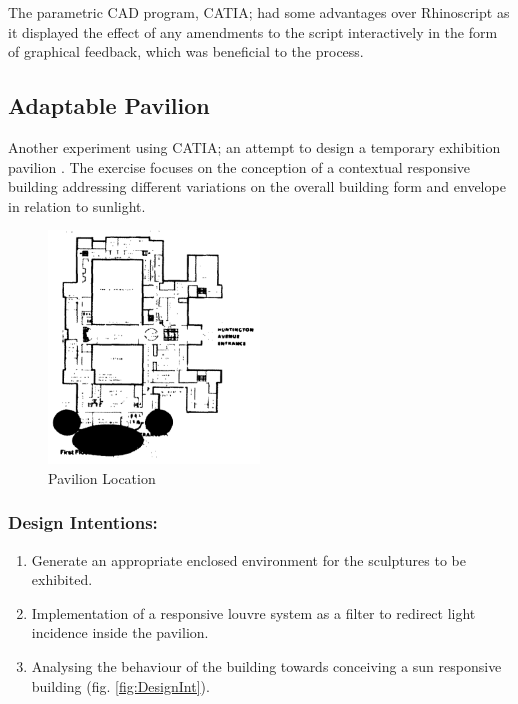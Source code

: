 The parametric CAD program, CATIA; had some advantages over Rhinoscript as it displayed the effect of any amendments to the script interactively in the form of graphical feedback, which was beneficial to the process. 

\subsection{Adaptable Pavilion}
\label{sec:AdptPav}

Another experiment using CATIA; an attempt to design a temporary exhibition pavilion \cite{zulas04}. The exercise focuses on the conception of a contextual responsive building addressing different variations on the overall building form and envelope in relation to sunlight. 

\begin{figure}[htbp]
\centering
\includegraphics[width=0.5\textwidth]{./Images/4-Location}
\caption[Case Study Location]{Pavilion Location \cite{zulas04}}
\label{fig:PvlLoc}
\end{figure}

\subsubsection{Design Intentions:} 

\begin{enumerate}
\item Generate an appropriate enclosed environment for the sculptures to be exhibited.
\item Implementation of a responsive louvre system as a filter to redirect light incidence inside the pavilion.
\item Analysing the behaviour of the building towards conceiving a sun responsive building (fig. \ref{fig:DesignInt}). 
\end{enumerate}

